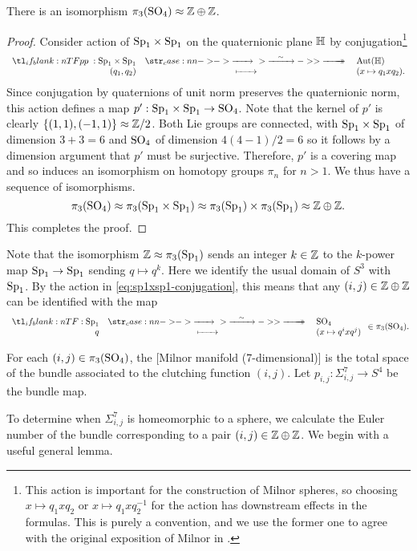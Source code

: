 \begin{proposition}\label{prop:3rd-homotopy-SO4}
	There is an isomorphism $\pi_3(\mathrm{SO}_4)\approx \mathbb{Z}\oplus \mathbb{Z}$.
\end{proposition}
\begin{proof}
	Consider action of $\mathrm{Sp}_1\times \mathrm{Sp}_1$ on the quaternionic plane $\mathbb{H}$ by conjugation\footnote{This action is important for the construction of Milnor spheres, so choosing $x\mapsto q_1xq_2$ or $x\mapsto q_1xq_2^{-1}$ for the action has downstream effects in the formulas. This is purely a convention, and we use the former one to agree with the original exposition of Milnor in \cite{milnor1956manifolds}.}
	\begin{equation}\label{eq:sp1xsp1-conjugation}
		\lkxfunc{p}{\Sp_1\times \Sp_1}{\Aut(\HH)}{(q_1,q_2)}{(x\mapsto q_1xq_2).}
	\end{equation}
	Since conjugation by quaternions of unit norm preserves the quaternionic norm, this action defines a map $p' : \mathrm{Sp}_1\times \mathrm{Sp}_1\to\mathrm{SO}_4$.
	Note that the kernel of $p'$ is clearly $\{(1,1),(-1,1)\}\approx \mathbb{Z}/2$. Both Lie groups are connected, with $\mathrm{Sp}_1\times \mathrm{Sp}_1$ of dimension $3+3=6$ and $\mathrm{SO}_4$ of dimension $4(4-1)/2=6$ so it follows by a dimension argument that $p'$ must be surjective. Therefore, $p'$ is a covering map and so induces an isomorphism on homotopy groups $\pi_n$ for $n>1$. We thus have a sequence of isomorphisms.
	\[
		\pi_3(\mathrm{SO}_4)\approx \pi_3(\mathrm{Sp}_1\times \mathrm{Sp}_1)\approx \pi_3(\mathrm{Sp}_1)\times \pi_3(\mathrm{Sp}_1) \approx \mathbb{Z}\oplus \mathbb{Z}.
	\]
	This completes the proof.
\end{proof}

Note that the isomorphism $\mathbb{Z}\approx \pi_3(\mathrm{Sp}_1)$ sends an integer $k\in \mathbb{Z}$ to the $k$-power map $\mathrm{Sp}_1\to \mathrm{Sp}_1$ sending $q\mapsto q^k$. Here we identify the usual domain of $S^3$ with $\mathrm{Sp}_1$. By the action in \cref{eq:sp1xsp1-conjugation}, this means that any $(i,j)\in \mathbb{Z}\oplus\mathbb{Z}$ can be identified with the map
\begin{equation}\label{eq:ij-associated-map}
	\lkxfunc{}{\Sp_1}{\SO_4}{q}{(x\mapsto q^ixq^{j})}\in \pi_3(\SO_4).
\end{equation}
\begin{definition}
	For each $(i,j)\in \pi_3(\mathrm{SO}_4)$, the [Milnor manifold (7-dimensional)] is the total space of the bundle associated to the clutching function $(i,j)$. Let $p_{i,j} : \Sigma_{i,j}^7 \to S^4$ be the bundle map.
\end{definition}

To determine when $\Sigma_{i,j}^7$ is homeomorphic to a sphere, we calculate the Euler number of the bundle corresponding to a pair $(i,j)\in \mathbb{Z}\oplus\mathbb{Z}$. We begin with a useful general lemma.

